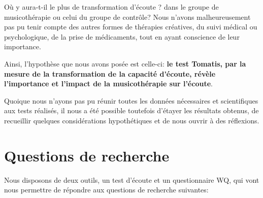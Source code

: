  Où y aura-t-il le plus de transformation d'écoute ? dans le groupe de musicothérapie  ou celui du 
 groupe de contrôle?
 Nous n'avons malheureusement pas pu  tenir compte des autres for\-mes de thérapies créatives, du 
 suivi médical ou 
 psychologique, de 
 la prise de médicaments, tout en ayant conscience de leur importance.
 

 
 

 Ainsi, l'hypothèse que nous avons posée est celle-ci: \textbf{le test Tomatis, par la  mesure de la  
 transformation de la capacité d'écoute, révèle  l'importance et l'impact  de la musicothérapie sur 
 l'écoute}.




Quoique nous n'ayons  pas pu réunir toutes les données nécessaires et scientifiques
aux tests réalisés, il nous a été possible toutefois d'étayer
les résultats obtenus, de recueillir quelques considérations hypothétiques et de nous ouvrir à des réflexions.







\section* {Questions de recherche}


Nous disposons de deux outils, un test d'écoute et un questionnaire WQ, qui vont nous permettre de 
répondre aux questions de recherche suivantes: 


